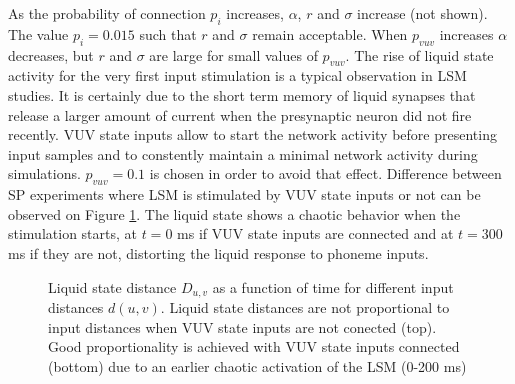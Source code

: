 \documentclass[11pt, a4paper]{article} %
\begin{document}
As the probability of connection $p_i$ increases, $\alpha$, $r$ and $\sigma$ increase (not shown). The value $p_i = 0.015$ such that $r$ and $\sigma$ remain acceptable. When $p_{vuv}$ increases $\alpha$ decreases, but $r$ and $\sigma$ are large for small values of $p_{vuv}$. The rise of liquid state activity for the very first input stimulation is a typical observation in LSM studies. It is certainly due to the short term memory of liquid synapses that release a larger amount of current when the presynaptic neuron did not fire recently. VUV state inputs allow to start the network activity before presenting input samples and to constently maintain a minimal network activity during simulations. $p_{vuv} = 0.1$ is chosen in order to avoid that effect. Difference between SP experiments where LSM is stimulated by VUV state inputs or not can be observed on Figure \ref{SPvuv}. The liquid state shows a chaotic behavior when the stimulation starts, at $t=0$ ms if VUV state inputs are connected and at $t=300$ ms if they are not, distorting the liquid response to phoneme inputs.

\begin{figure}
\center
{}
\caption{Liquid state distance $D_{u,v}$ as a function of time for different input distances $d(u,v)$. Liquid state distances are not proportional to input distances when VUV state inputs are not conected (top). Good proportionality is achieved with VUV state inputs connected (bottom) due to an earlier chaotic activation of the LSM (0-200 ms)}
\label{SPvuv}
\end{figure}
\end{document}
